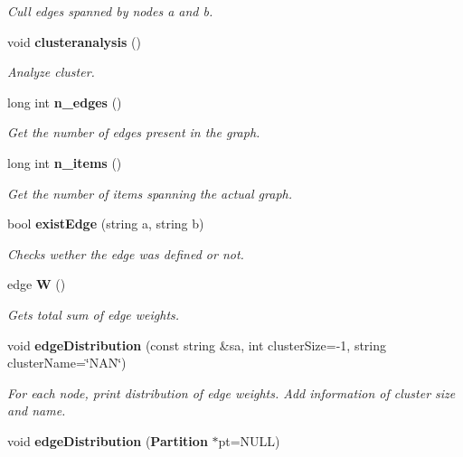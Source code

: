 \begin{CompactItemize}
\begin{CompactList}\small\item\em Cull edges spanned by nodes a and b. \item\end{CompactList}\item 
void {\bf clusteranalysis} ()\label{classMatrixOfValues_a22}

\begin{CompactList}\small\item\em Analyze cluster. \item\end{CompactList}\item 
long int {\bf n\_\-edges} ()\label{classMatrixOfValues_a23}

\begin{CompactList}\small\item\em Get the number of edges present in the graph. \item\end{CompactList}\item 
long int {\bf n\_\-items} ()\label{classMatrixOfValues_a24}

\begin{CompactList}\small\item\em Get the number of items spanning the actual graph. \item\end{CompactList}\item 
bool {\bf exist\-Edge} (string a, string b)\label{classMatrixOfValues_a25}

\begin{CompactList}\small\item\em Checks wether the edge was defined or not. \item\end{CompactList}\item 
edge {\bf W} ()\label{classMatrixOfValues_a26}

\begin{CompactList}\small\item\em Gets total sum of edge weights. \item\end{CompactList}\item 
void {\bf edge\-Distribution} (const string \&sa, int cluster\-Size=-1, string cluster\-Name=\char`\"{}NAN\char`\"{})
\begin{CompactList}\small\item\em For each node, print distribution of edge weights. Add information of cluster size and name. \item\end{CompactList}\item 
void {\bf edge\-Distribution} ({\bf Partition} $\ast$pt=NULL)\label{classMatrixOfValues_a28}


\end{CompactItemize}

